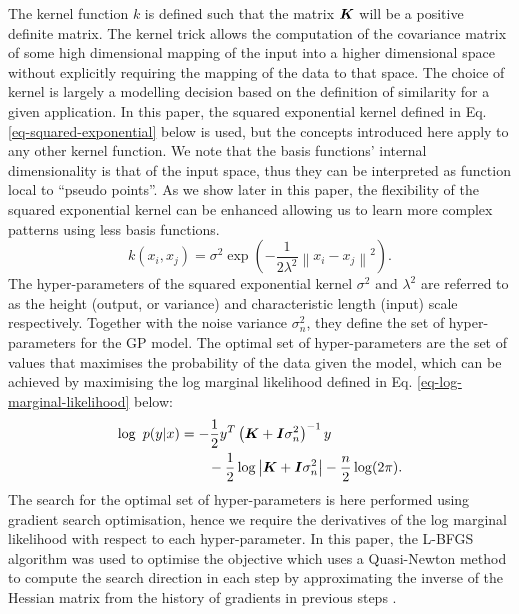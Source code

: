 \documentclass[useAMS,usenatbib,fleqn]{mn2e}
\begin{document}
The kernel function $k$ is defined such that the matrix $\bmath{K}$ will be a positive definite matrix. The kernel trick allows the computation of the covariance matrix of some high dimensional mapping of the input into a higher dimensional space without explicitly requiring the mapping of the data to that space. The choice of kernel is largely a modelling decision based on the definition of similarity for a given application. In this paper, the squared exponential kernel defined in  Eq. \eqref{eq-squared-exponential} below is used, but the concepts introduced here apply to any other kernel function. We note that the basis functions' internal dimensionality is that of the input space, thus they can be interpreted as function local to ``pseudo points''. As we show later in this paper, the flexibility of the squared exponential kernel can be enhanced allowing us to learn more complex patterns using less basis functions.
\begin{equation}
\label{eq-squared-exponential}
k(x_{i},x_{j}) = \sigma^{2} \exp \left ( -\frac{1} {2\lambda^{2}} \left \|x_{i}-x_{j}\right\|^{2}\right ).
\end{equation}
The hyper-parameters of the squared exponential kernel $\sigma^{2}$ and $\lambda^{2}$ are referred to as the height (output, or variance) and characteristic length (input) scale respectively. Together with the noise variance $\sigma_{n}^{2}$, they define the set of hyper-parameters for the GP model. The optimal set of hyper-parameters are the set of values that maximises the probability of the data given the model, which can be achieved by maximising the log marginal likelihood defined in Eq. \eqref{eq-log-marginal-likelihood} below:
\begin{align}
\label{eq-log-marginal-likelihood}
\log\text{ }p(y|x) &= -\frac{1}{2}y^{T}\left(\bmath{K}+\bmath{I}\sigma_{n}^{2} \right)^{-1}y \nonumber \\
&\qquad -\frac{1}{2} \log\left | \bmath{K}+\bmath{I}\sigma_{n}^{2}\right|-\frac{n}{2}\log(2\pi).
\end{align}
The search for the optimal set of hyper-parameters is here performed using gradient search optimisation, hence we require the derivatives of the log marginal likelihood with respect to each hyper-parameter. In this paper, the L-BFGS algorithm was used to optimise the objective which uses a Quasi-Newton method to compute the search direction in each step by approximating the inverse of the Hessian matrix from the history of gradients in previous steps \citep{jorge1980}.
\end{document}
